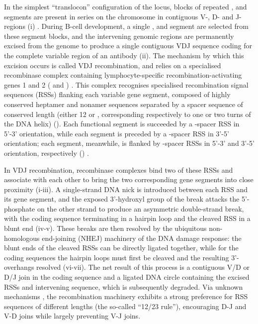 In the simplest ``translocon'' configuration of the \igh{} locus, blocks of repeated \vh, \dh and \jh segments are present in series on the chromosome in contiguous V-, D- and J-regions (i) \parencite{schroeder2010immunoglobulins,jung2006vdjr}. During B-cell development, a single \vh, \dh and \jh segment are selected from these segment blocks, and the intervening genomic regions are permanently excised from the genome to produce a single contiguous VDJ sequence coding for the complete variable region of an antibody (ii). The mechanism by which this excision occurs is called VDJ recombination, and relies on a specialised recombinase complex containing lymphocyte-specific recombination-activating genes 1 and 2 ( and ) \parencite{jung2006vdjr,schatz2011vdjr}. This complex recognises specialised recombination signal sequences (RSSs) flanking each variable gene segment, composed of highly conserved heptamer and nonamer sequences separated by a spacer sequence of conserved length (either 12 or , corresponding respectively to one or two turns of the DNA helix) \parencite{hesse1989rss} (). Each functional \vh segment is succeeded by a -spacer RSS in 5'-3' orientation, while each \jh segment is preceded by a -spacer RSS in 3'-5' orientation; each \dh segment, meanwhile, is flanked by -spacer RSSs in 5'-3' and 3'-5' orientation, respectively () \parencite{schatz2011vdjr}. 

In VDJ recombination, recombinase complexes bind two of these RSSs and associate with each other to bring the two corresponding gene segments into close proximity (i-iii). A single-strand DNA nick is introduced between each RSS and its gene segment, and the exposed 3'-hydroxyl group of the break attacks the 5'-phosphate on the other strand to produce an asymmetric double-strand break, with the coding sequence terminating in a hairpin loop and the cleaved RSS in a blunt end \parencite{schroeder2010immunoglobulins,schatz2011vdjr} (iv-v). These breaks are then resolved by the ubiquitous non-homologous end-joining (NHEJ) machinery of the DNA damage response: the blunt ends of the cleaved RSSs can be directly ligated together, while for the coding sequences the hairpin loops must first be cleaved and the resulting 3'-overhangs resolved \parencite{schroeder2010immunoglobulins,schatz2011vdjr} (vi-vii). The net result of this process is a contiguous V/D or D/J join in the coding sequence and a ligated DNA circle containing the excised RSSs and intervening sequence, which is subsequently degraded. Via unknown mechanisms \parencite{schatz2011vdjr}, the recombination machinery exhibits a strong preference for RSS sequences of different lengths (the so-called ``12/23 rule''), encouraging  D-J and V-D joins while largely preventing V-J joins. 

